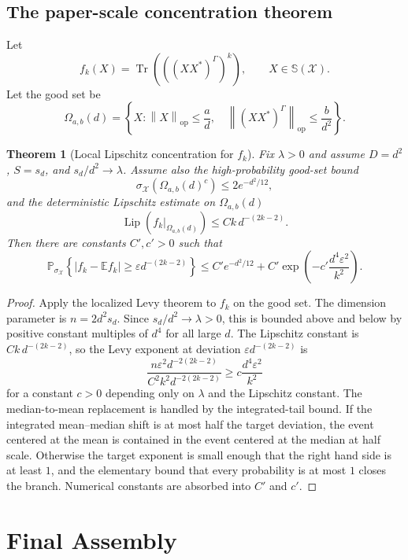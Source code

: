 \documentclass[11pt,oneside]{book}
\newtheorem{theorem}{Theorem}[chapter]
\DeclareMathOperator{\Tr}{Tr}
\DeclareMathOperator{\Lip}{Lip}
\newcommand{\E}{\mathbb E}
\newcommand{\Prob}{\mathbb P}
\newcommand{\1}{\mathbf 1}
\newcommand{\Sphere}{\mathbb S}
\newcommand{\eps}{\varepsilon}
\newcommand{\pt}{\Gamma}
\newcommand{\op}{\mathrm{op}}
\newcommand{\norm}[1]{\left\|#1\right\|}
\begin{document}
\section{The paper-scale concentration theorem}

Let
\[
  f_k(X)=\Tr\left(\left((XX^*)^\pt\right)^k\right),
  \qquad X\in\Sphere(\mathcal X).
\]
Let the good set be
\[
  \Omega_{a,b}(d)=
  \left\{X:
    \norm X_{\op}\le \frac a d,\quad
    \norm{(XX^*)^\pt}_{\op}\le \frac b{d^2}
  \right\}.
\]

\begin{theorem}[Local Lipschitz concentration for \(f_k\)]
Fix \(\lambda>0\) and assume \(D=d^2\), \(S=s_d\), and
\(s_d/d^2\to\lambda\).  Assume also the high-probability good-set bound
\[
  \sigma_{\mathcal X}(\Omega_{a,b}(d)^c)\le
  2e^{-d^2/12},
\]
and the deterministic Lipschitz estimate on \(\Omega_{a,b}(d)\)
\[
  \Lip(f_k|_{\Omega_{a,b}(d)})\le Ck\,d^{-(2k-2)}.
\]
Then there are constants \(C',c'>0\) such that
\[
  \Prob_{\sigma_{\mathcal X}}\left\{
    |f_k-\E f_k|\ge \eps d^{-(2k-2)}
  \right\}
  \le
  C'e^{-d^2/12}
  +C'\exp\left(-c'\frac{d^4\eps^2}{k^2}\right).
\]
\end{theorem}

\begin{proof}
Apply the localized Levy theorem to \(f_k\) on the good set.  The dimension
parameter is \(n=2d^2s_d\).  Since \(s_d/d^2\to\lambda>0\), this is bounded
above and below by positive constant multiples of \(d^4\) for all large \(d\).
The Lipschitz constant is
\(Ck\,d^{-(2k-2)}\), so the Levy exponent at deviation
\(\eps d^{-(2k-2)}\) is
\[
  \frac{n\eps^2d^{-2(2k-2)}}{C^2k^2d^{-2(2k-2)}}
  \ge c\frac{d^4\eps^2}{k^2}
\]
for a constant \(c>0\) depending only on \(\lambda\) and the Lipschitz
constant.
The median-to-mean replacement is handled by the integrated-tail bound.  If
the integrated mean--median shift is at most half the target deviation, the
event centered at the mean is contained in the event centered at the median
at half scale.  Otherwise the target exponent is small enough that the right
hand side is at least \(1\), and the elementary bound that every probability
is at most \(1\) closes the branch.  Numerical constants are absorbed into
\(C'\) and \(c'\).
\end{proof}

\chapter{Final Assembly}
\end{document}
